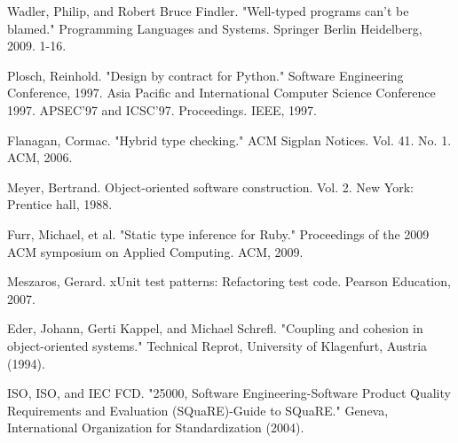 \documentclass[preprint]{sigplanconf}
\begin{document}
\begin{thebibliography}{}
Wadler, Philip, and Robert Bruce Findler. "Well-typed programs can’t be blamed." Programming Languages and Systems. Springer Berlin Heidelberg, 2009. 1-16.

Plosch, Reinhold. "Design by contract for Python." Software Engineering Conference, 1997. Asia Pacific and International Computer Science Conference 1997. APSEC'97 and ICSC'97. Proceedings. IEEE, 1997.

Flanagan, Cormac. "Hybrid type checking." ACM Sigplan Notices. Vol. 41. No. 1. ACM, 2006.

Meyer, Bertrand. Object-oriented software construction. Vol. 2. New York: Prentice hall, 1988.

Furr, Michael, et al. "Static type inference for Ruby." Proceedings of the 2009 ACM symposium on Applied Computing. ACM, 2009.

Meszaros, Gerard. xUnit test patterns: Refactoring test code. Pearson Education, 2007.

Eder, Johann, Gerti Kappel, and Michael Schrefl. "Coupling and cohesion in object-oriented systems." Technical Reprot, University of Klagenfurt, Austria (1994).

ISO, ISO, and IEC FCD. "25000, Software Engineering-Software Product Quality Requirements and Evaluation (SQuaRE)-Guide to SQuaRE." Geneva, International Organization for Standardization (2004).

\end{thebibliography}
\end{document}
